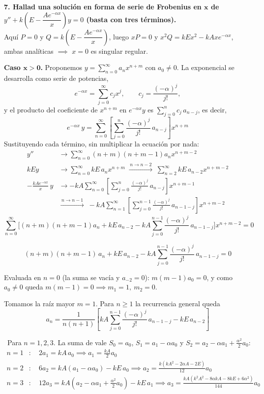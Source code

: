 \documentclass[11pt, a4paper]{article}
\begin{document}
\noindent\textbf{7. Hallad una solución en forma de serie de Frobenius en $\bm{x}$ de $y''+k\left(E-\dfrac{Ae^{-\alpha x}}{x}\right)y=0$ (basta con tres términos).} \\
Aquí $P=0$ y $Q=k\left(E-\dfrac{Ae^{-\alpha x}}{x}\right)$, luego $xP=0$ y $x^2Q=kEx^2-kAxe^{-\alpha x}$, ambas analíticas $\implies$ $x=0$ es singular regular.

\vspace{0.2cm}\noindent\textbf{Caso $\bm{x>0}$.} Proponemos $y=\sum_{n=0}^\infty a_nx^{n+m}$ con $a_0\neq0$. La exponencial se desarrolla como serie de potencias,
\[
e^{-\alpha x}=\sum_{j=0}^\infty c_jx^j, \qquad c_j=\frac{(-\alpha)^j}{j!},
\]
y el producto del coeficiente de $x^{n+m}$ en $e^{-\alpha x}y$ es $\sum_{j=0}^{n}c_j\,a_{n-j}$, es decir,
\[
e^{-\alpha x}\,y=\sum_{n=0}^\infty\left[\sum_{j=0}^{n}\frac{(-\alpha)^j}{j!}\,a_{n-j}\right]x^{n+m}
\]
Sustituyendo cada término, sin multiplicar la ecuación por nada:
\begin{align*}
y'' &\to \sum_{n=0}^\infty (n+m)(n+m-1)a_nx^{n+m-2} \\
kEy &\to \sum_{n=0}^\infty kE\,a_nx^{n+m} \;\xrightarrow{\,n\to n-2\,}\; \sum_{n=2}^\infty kE\,a_{n-2}x^{n+m-2} \\
-\frac{kAe^{-\alpha x}}{x}\,y &\to -kA\sum_{n=0}^\infty\left[\sum_{j=0}^{n}\frac{(-\alpha)^j}{j!}\,a_{n-j}\right]x^{n+m-1} \\
&\xrightarrow{\,n\to n-1\,}\; -kA\sum_{n=1}^\infty\left[\sum_{j=0}^{n-1}\frac{(-\alpha)^j}{j!}\,a_{n-1-j}\right]x^{n+m-2}
\end{align*}
\[
\sum_{n=0}^\infty\Bigg[(n+m)(n+m-1)a_n+kE\,a_{n-2}-kA\sum_{j=0}^{n-1}\frac{(-\alpha)^j}{j!}\,a_{n-1-j}\Bigg]x^{n+m-2}=0
\]

\[
(n+m)(n+m-1)\,a_n+kE\,a_{n-2}-kA\sum_{j=0}^{n-1}\frac{(-\alpha)^j}{j!}\,a_{n-1-j}=0
\]

\smallskip\noindent Evaluada en $n=0$ (la suma se vacía y $a_{-2}=0$): $m(m-1)a_0=0$, y como $a_0\neq0$ queda  $m(m-1)=0 \implies m_1=1,\ m_2=0$.

\smallskip\noindent Tomamos la raíz mayor $m=1$. Para $n\geq1$ la recurrencia general queda
\[
a_n=\frac{1}{n(n+1)}\left[kA\sum_{j=0}^{n-1}\frac{(-\alpha)^j}{j!}\,a_{n-1-j}-kE\,a_{n-2}\right]
\]

\smallskip\noindent\ Para $n=1,2,3$. La suma de vale $S_0=a_0$, $S_1=a_1-\alpha a_0$ y $S_2=a_2-\alpha a_1+\tfrac{\alpha^2}{2}a_0$:
\begin{align*}
n=1&: \quad 2a_1=kA\,a_0 \implies a_1=\frac{kA}{2}a_0 \\
n=2&: \quad 6a_2=kA(a_1-\alpha a_0)-kE\,a_0 \implies a_2=\frac{k\left(kA^2-2\alpha A-2E\right)}{12}a_0 \\
n=3&: \quad 12a_3=kA\left(a_2-\alpha a_1+\tfrac{\alpha^2}{2}a_0\right)-kE\,a_1 \implies a_3=\frac{kA\left(k^2A^2-8\alpha kA-8kE+6\alpha^2\right)}{144}a_0
\end{align*}
\end{document}
